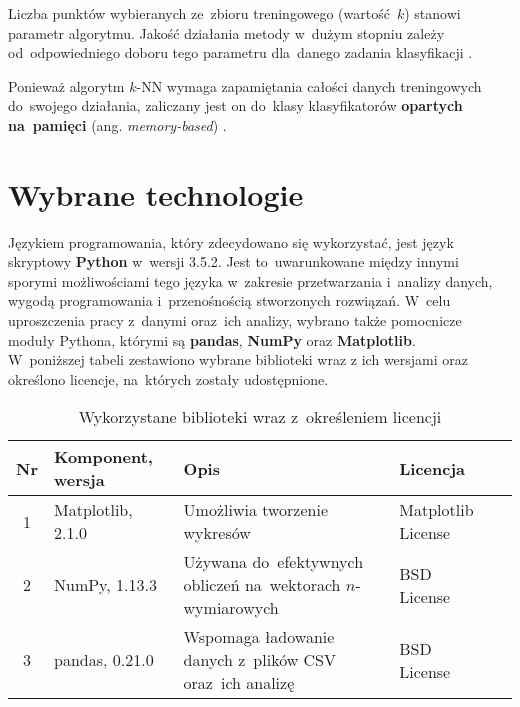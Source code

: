 \documentclass[11pt,a4paper]{article}
\begin{document}
Liczba punktów wybieranych ze~zbioru treningowego (wartość~$k$) stanowi parametr algorytmu.
Jakość działania metody w~dużym stopniu zależy od~odpowiedniego doboru tego parametru dla~danego zadania klasyfikacji \cite[s.~468--470]{hastie2009}.

Ponieważ algorytm $k$-NN wymaga zapamiętania całości danych treningowych do~swojego działania, zaliczany jest on do~klasy klasyfikatorów \textbf{opartych na~pamięci} (ang. \emph{memory-based}) \cite[s.~463]{hastie2009}.

\section{Wybrane technologie}
Językiem programowania, który zdecydowano się wykorzystać, jest język skryptowy \textbf{Python} w~wersji 3.5.2.
Jest to~uwarunkowane między innymi sporymi możliwościami tego języka w~zakresie przetwarzania i~analizy danych, wygodą programowania i~przenośnością stworzonych rozwiązań.
W~celu uproszczenia pracy z~danymi oraz~ich analizy, wybrano także pomocnicze moduły Pythona, którymi są \textbf{pandas}, \textbf{NumPy} oraz \textbf{Matplotlib}.\\

\noindent
W~poniższej tabeli zestawiono wybrane biblioteki wraz z ich wersjami oraz określono licencje, na~których zostały udostępnione.
\begin{table}[H]
    \begin{tabularx}{\textwidth}{|c|l|X|l|c|}
        \hline
        \textbf{Nr} & \textbf{Komponent, wersja} & \textbf{Opis} & \textbf{Licencja} & \\
        \hline
        \hline
        1 & 
        Matplotlib, 2.1.0 & 
        Umożliwia tworzenie wykresów &
        Matplotlib License &
        \cite{matplotlib} \\
        \hline
        2 & 
        NumPy, 1.13.3 &
        Używana do~efektywnych obliczeń na~wektorach $n$-wymiarowych &
        BSD License &
        \cite{numpy} \\
        \hline
        3 &
        pandas, 0.21.0 &
        Wspomaga ładowanie danych z~plików CSV oraz~ich analizę &
        BSD License &
        \cite{pandas} \\
        \hline
    \end{tabularx}
    \caption{Wykorzystane biblioteki wraz z~określeniem licencji}
\end{table}
\end{document}
